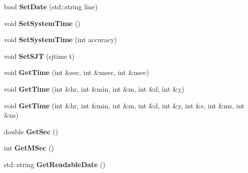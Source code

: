 \begin{DoxyCompactItemize}
\item 
\hypertarget{classmint_1_1_time_a5dc6d9a4729f807bbb894361897554ef}{bool {\bfseries Set\+Date} (std\+::string line)}\label{classmint_1_1_time_a5dc6d9a4729f807bbb894361897554ef}

\item 
\hypertarget{classmint_1_1_time_ade3c4ba18ef49f5254226ab9d548b0ac}{void {\bfseries Set\+System\+Time} ()}\label{classmint_1_1_time_ade3c4ba18ef49f5254226ab9d548b0ac}

\item 
\hypertarget{classmint_1_1_time_a26375abb640f9cb2499225c62bfcaf9c}{void {\bfseries Set\+System\+Time} (int accuracy)}\label{classmint_1_1_time_a26375abb640f9cb2499225c62bfcaf9c}

\item 
\hypertarget{classmint_1_1_time_afadda4b9f265bd5741ba85f2635bc9ca}{void {\bfseries Set\+S\+J\+T} (sjtime t)}\label{classmint_1_1_time_afadda4b9f265bd5741ba85f2635bc9ca}

\item 
\hypertarget{classmint_1_1_time_a90ff48b16a9827b285ec300fdc413165}{void {\bfseries Get\+Time} (int \&sec, int \&msec, int \&nsec)}\label{classmint_1_1_time_a90ff48b16a9827b285ec300fdc413165}

\item 
\hypertarget{classmint_1_1_time_a1f063ef95f23d0f349c1984c0f76ffa4}{void {\bfseries Get\+Time} (int \&hr, int \&min, int \&m, int \&d, int \&\hyperlink{_ice_utils_8h_aa7ffaed69623192258fb8679569ff9ba}{y})}\label{classmint_1_1_time_a1f063ef95f23d0f349c1984c0f76ffa4}

\item 
\hypertarget{classmint_1_1_time_a755fddd273f02ea00d1cb2b779108ab3}{void {\bfseries Get\+Time} (int \&hr, int \&min, int \&m, int \&d, int \&\hyperlink{_ice_utils_8h_aa7ffaed69623192258fb8679569ff9ba}{y}, int \&s, int \&ms, int \&ns)}\label{classmint_1_1_time_a755fddd273f02ea00d1cb2b779108ab3}

\item 
\hypertarget{classmint_1_1_time_a04b1c621bb3319d716905661850a0760}{double {\bfseries Get\+Sec} ()}\label{classmint_1_1_time_a04b1c621bb3319d716905661850a0760}

\item 
\hypertarget{classmint_1_1_time_ab82a6231af6034da7e02c671b9b34bb9}{int {\bfseries Get\+M\+Sec} ()}\label{classmint_1_1_time_ab82a6231af6034da7e02c671b9b34bb9}

\item 
\hypertarget{classmint_1_1_time_ae645c5d25683c38992e20ad3dab78132}{std\+::string {\bfseries Get\+Readable\+Date} ()}\label{classmint_1_1_time_ae645c5d25683c38992e20ad3dab78132}


\end{DoxyCompactItemize}
